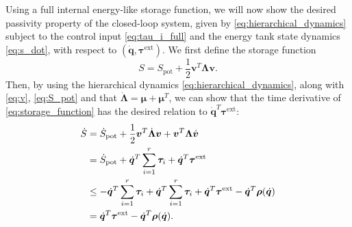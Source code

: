 \documentclass[../main.tex]{subfiles}
\begin{document}
Using a full internal energy-like storage function, we will now show the desired passivity property of the closed-loop system, given by \eqref{eq:hierarchical_dynamics} subject to the control input \eqref{eq:tau_i_full} and the energy tank state dynamics \eqref{eq:s_dot}, with respect to $(\dot{\bm{q}},\bm{\tau}^\mathrm{ext})$.
We first define the storage function
\begin{equation} \label{eq:storage_function}
    S = S_{\mathrm{pot}} + \frac{1}{2}\bm{v}^T\bm{\Lambda} \bm{v}.
\end{equation}
Then, by using the hierarchical dynamics \eqref{eq:hierarchical_dynamics}, along with \eqref{eq:v}, \eqref{eq:S_pot} and that $\dot{\bm{\Lambda}}=\bm{\mu}+\bm{\mu}^T$, we can show that the time derivative of \eqref{eq:storage_function} has the desired relation to $\dot{\bm{q}}^T \bm{\tau}^\mathrm{ext}$:
\begin{equation} \label{eq:S_dot}
    \begin{aligned}
        \dot{S}  & = \dot{S}_{\mathrm{pot}} + \frac{1}{2}\bm{v}^T\dot{\bm{\Lambda}}\bm{v} + \bm{v}^T\bm{\Lambda} \dot{\bm{v}} \\
         & = \dot{S}_{\mathrm{pot}} + \dot{\bm{q}}^T \sum_{i=1}^r \bm{\tau}_{i} + \dot{\bm{q}}^T \bm{\tau}^\mathrm{ext} \\
         & \leq - \dot{\bm{q}}^T \sum_{i=1}^r \bm{\tau_}{i} + \dot{\bm{q}}^T \sum_{i=1}^r \bm{\tau_}{i} + \dot{\bm{q}}^T\bm{\tau}^\mathrm{ext} 
         -\dot{\bm{q}}^T\bm{\rho}(\dot{\bm{q}})\\
         & = \dot{\bm{q}}^T \bm{\tau}^\mathrm{ext}
         - \dot{\bm{q}}^T\bm{\rho}(\dot{\bm{q}}).
        \end{aligned}
\end{equation}
\end{document}
